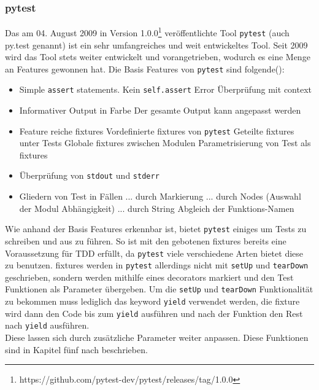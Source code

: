 \subsubsection{pytest}\label{python-tools:pytest}\mbox{}
\newline
Das am 04. August 2009 in Version
1.0.0\footnote{https://github.com/pytest-dev/pytest/releases/tag/1.0.0}
veröffentlichte Tool \lstinline{pytest} (auch py.test genannt)
ist ein sehr umfangreiches und weit entwickeltes Tool. Seit 2009 wird das Tool
stets weiter entwickelt und vorangetrieben, wodurch es eine Menge an Features
gewonnen hat.
\noindent
Die Basis Features von \lstinline{pytest} sind folgende(\cite{docs.pytest.org:4.4}):
\begin{itemize}
    \item Simple \lstinline{assert} statements.
    \subitem Kein \lstinline{self.assert}
    \subitem Error Überprüfung mit \Gls{context}
    \item Informativer Output in Farbe
    \subitem Der gesamte Output kann angepasst werden
    \item Feature reiche \Glspl{fixture}
    \subitem Vordefinierte \Glspl{fixture} von \lstinline{pytest}
    \subitem Geteilte \Glspl{fixture} unter Tests
    \subitem Globale \Glspl{fixture} zwischen Modulen
    \subitem Parametrisierung von Test als \Glspl{fixture}
    \item Überprüfung von \lstinline{stdout} und \lstinline{stderr}
    \item Gliedern von Test in Fällen
    \subitem ... durch Markierung
    \subitem ... durch Nodes (Auswahl der Modul Abhängigkeit)
    \subitem ... durch String Abgleich der Funktions-Namen
\end{itemize}
\noindent
Wie anhand der Basis Features erkennbar ist, bietet \lstinline{pytest} einiges
um Tests zu schreiben und aus zu führen. So ist mit den gebotenen
\Glspl{fixture} bereits eine Voraussetzung für TDD erfüllt, da
\lstinline{pytest} viele verschiedene Arten bietet diese zu benutzen.
\Glspl{fixture} werden in \lstinline{pytest} allerdings nicht mit
\lstinline{setUp} und \lstinline{tearDown} geschrieben, sondern werden mithilfe
eines \glspl{decorator} markiert und den Test Funktionen als Parameter
übergeben. Um die \lstinline{setUp} und \lstinline{tearDown} Funktionalität zu
bekommen muss lediglich das keyword \lstinline{yield} verwendet werden, die
\Gls{fixture} wird dann den Code bis zum \lstinline{yield} ausführen und nach
der Funktion den Rest nach \lstinline{yield} ausführen.
\newline
\\
Diese lassen sich durch zusätzliche Parameter weiter anpassen. Diese
Funktionen sind in Kapitel fünf nach \cite{docs.pytest.org:4.4} beschrieben.

